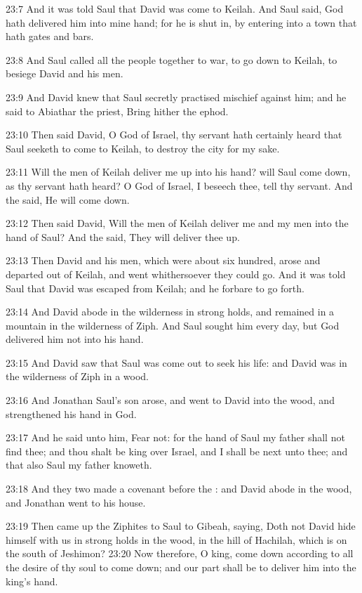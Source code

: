 23:7 And it was told Saul that David was come to Keilah. And Saul
said, God hath delivered him into mine hand; for he is shut in, by
entering into a town that hath gates and bars.

23:8 And Saul called all the people together to war, to go down to
Keilah, to besiege David and his men.

23:9 And David knew that Saul secretly practised mischief against him;
and he said to Abiathar the priest, Bring hither the ephod.

23:10 Then said David, O \LORD God of Israel, thy servant hath
certainly heard that Saul seeketh to come to Keilah, to destroy the
city for my sake.

23:11 Will the men of Keilah deliver me up into his hand? will Saul
come down, as thy servant hath heard? O \LORD God of Israel, I beseech
thee, tell thy servant. And the \LORD said, He will come down.

23:12 Then said David, Will the men of Keilah deliver me and my men
into the hand of Saul? And the \LORD said, They will deliver thee up.

23:13 Then David and his men, which were about six hundred, arose and
departed out of Keilah, and went whithersoever they could go. And it
was told Saul that David was escaped from Keilah; and he forbare to go
forth.

23:14 And David abode in the wilderness in strong holds, and remained
in a mountain in the wilderness of Ziph. And Saul sought him every
day, but God delivered him not into his hand.

23:15 And David saw that Saul was come out to seek his life: and David
was in the wilderness of Ziph in a wood.

23:16 And Jonathan Saul's son arose, and went to David into the wood,
and strengthened his hand in God.

23:17 And he said unto him, Fear not: for the hand of Saul my father
shall not find thee; and thou shalt be king over Israel, and I shall
be next unto thee; and that also Saul my father knoweth.

23:18 And they two made a covenant before the \LORD: and David abode in
the wood, and Jonathan went to his house.

23:19 Then came up the Ziphites to Saul to Gibeah, saying, Doth not
David hide himself with us in strong holds in the wood, in the hill of
Hachilah, which is on the south of Jeshimon?  23:20 Now therefore, O
king, come down according to all the desire of thy soul to come down;
and our part shall be to deliver him into the king's hand.

